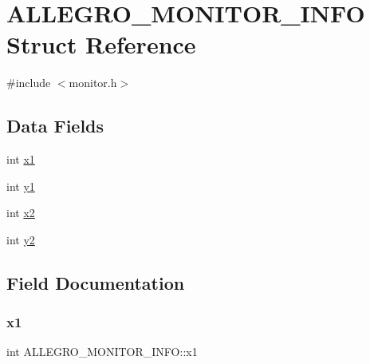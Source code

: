 \hypertarget{struct_a_l_l_e_g_r_o___m_o_n_i_t_o_r___i_n_f_o}{}\section{A\+L\+L\+E\+G\+R\+O\+\_\+\+M\+O\+N\+I\+T\+O\+R\+\_\+\+I\+N\+FO Struct Reference}
\label{struct_a_l_l_e_g_r_o___m_o_n_i_t_o_r___i_n_f_o}


{\ttfamily \#include $<$monitor.\+h$>$}

\subsection*{Data Fields}
\begin{DoxyCompactItemize}
\item 
int \hyperlink{struct_a_l_l_e_g_r_o___m_o_n_i_t_o_r___i_n_f_o_a1aeff110ae2d75b8d9ff6448950cab2f}{x1}
\item 
int \hyperlink{struct_a_l_l_e_g_r_o___m_o_n_i_t_o_r___i_n_f_o_ab8edecf4a1d3b7af6d16895f8e04c375}{y1}
\item 
int \hyperlink{struct_a_l_l_e_g_r_o___m_o_n_i_t_o_r___i_n_f_o_a497f33bcdcc713155186dd2396548c59}{x2}
\item 
int \hyperlink{struct_a_l_l_e_g_r_o___m_o_n_i_t_o_r___i_n_f_o_a1d50a2ff1dca21876b94a965d831c31e}{y2}
\end{DoxyCompactItemize}


\subsection{Field Documentation}
\mbox{\label{struct_a_l_l_e_g_r_o___m_o_n_i_t_o_r___i_n_f_o_a1aeff110ae2d75b8d9ff6448950cab2f}} 
\subsubsection{\texorpdfstring{x1}{x1}}
{\footnotesize\ttfamily int A\+L\+L\+E\+G\+R\+O\+\_\+\+M\+O\+N\+I\+T\+O\+R\+\_\+\+I\+N\+F\+O\+::x1}

\mbox{\label{struct_a_l_l_e_g_r_o___m_o_n_i_t_o_r___i_n_f_o_a497f33bcdcc713155186dd2396548c59}} 
